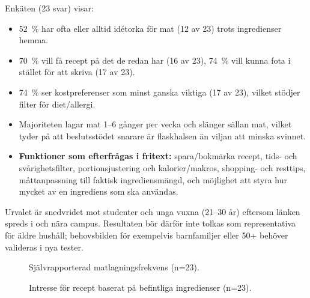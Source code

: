 \documentclass[a4paper,12pt]{article}
\begin{document}
Enkäten (23 svar) visar:
\begin{itemize}
    \item 52~\% har ofta eller alltid idétorka för mat (12 av 23) trots ingredienser hemma.
    \item 70~\% vill få recept på det de redan har (16 av 23), 74~\% vill kunna fota i stället för att skriva (17 av 23).
    \item 74~\% ser kostpreferenser som minst ganska viktiga (17 av 23), vilket stödjer filter för diet/allergi.
    \item Majoriteten lagar mat 1--6 gånger per vecka och slänger sällan mat, vilket tyder på att beslutsstödet snarare är flaskhalsen än viljan att minska svinnet.
    \item \textbf{Funktioner som efterfrågas i fritext:} spara/bokmärka recept, tids- och svårighetsfilter, portionsjustering och kalorier/makros, shopping- och resttips, måttanpassning till faktisk ingrediensmängd, och möjlighet att styra hur mycket av en ingrediens som ska användas.
\end{itemize}
Urvalet är snedvridet mot studenter och unga vuxna (21--30 år) eftersom länken spreds i och nära campus. Resultaten bör därför inte tolkas som representativa för äldre hushåll; behovsbilden för exempelvis barnfamiljer eller 50+ behöver valideras i nya tester.
\begin{figure}[h]
    \centering
    \caption{Självrapporterad matlagningsfrekvens (n=23).}
    \label{fig:cooking-frequency}
\end{figure}
\begin{figure}[h]
    \centering
    \caption{Intresse för recept baserat på befintliga ingredienser (n=23).}
    \label{fig:ingredient-interest}
\end{figure}
\end{document}
